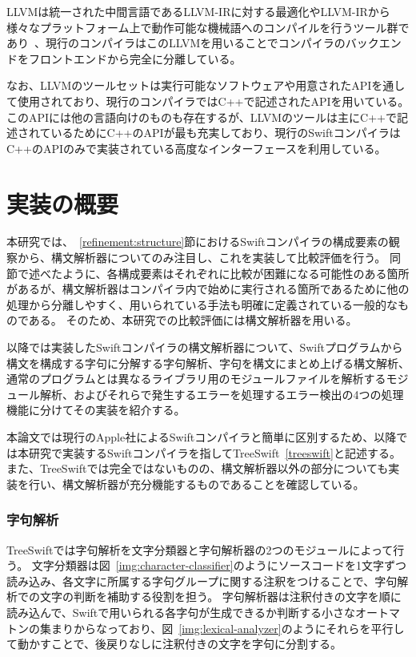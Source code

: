 LLVMは統一された中間言語であるLLVM-IRに対する最適化やLLVM-IRから様々なプラットフォーム上で動作可能な機械語へのコンパイルを行うツール群であり~\cite{llvm}、現行のコンパイラはこのLLVMを用いることでコンパイラのバックエンドをフロントエンドから完全に分離している。

なお、LLVMのツールセットは実行可能なソフトウェアや用意されたAPIを通して使用されており、現行のコンパイラではC++で記述されたAPIを用いている。
このAPIには他の言語向けのものも存在するが、LLVMのツールは主にC++で記述されているためにC++のAPIが最も充実しており、現行のSwiftコンパイラはC++のAPIのみで実装されている高度なインターフェースを利用している。

\section{実装の概要}
\label{implementation:abstract}

本研究では、~\ref{refinement:structure}節におけるSwiftコンパイラの構成要素の観察から、構文解析器についてのみ注目し、これを実装して比較評価を行う。
同節で述べたように、各構成要素はそれぞれに比較が困難になる可能性のある箇所があるが、構文解析器はコンパイラ内で始めに実行される箇所であるために他の処理から分離しやすく、用いられている手法も明確に定義されている一般的なものである。
そのため、本研究での比較評価には構文解析器を用いる。

以降では実装したSwiftコンパイラの構文解析器について、Swiftプログラムから構文を構成する字句に分解する字句解析、字句を構文にまとめ上げる構文解析、通常のプログラムとは異なるライブラリ用のモジュールファイルを解析するモジュール解析、およびそれらで発生するエラーを処理するエラー検出の4つの処理機能に分けてその実装を紹介する。

本論文では現行のApple社によるSwiftコンパイラと簡単に区別するため、以降では本研究で実装するSwiftコンパイラを指してTreeSwift~\ref{treeswift}と記述する。
また、TreeSwiftでは完全ではないものの、構文解析器以外の部分についても実装を行い、構文解析器が充分機能するものであることを確認している。

\subsubsection{字句解析}

TreeSwiftでは字句解析を文字分類器と字句解析器の2つのモジュールによって行う。
文字分類器は図~\ref{img:character-classifier}のようにソースコードを1文字ずつ読み込み、各文字に所属する字句グループに関する注釈をつけることで、字句解析での文字の判断を補助する役割を担う。
字句解析器は注釈付きの文字を順に読み込んで、Swiftで用いられる各字句が生成できるか判断する小さなオートマトンの集まりからなっており、図~\ref{img:lexical-analyzer}のようにそれらを平行して動かすことで、後戻りなしに注釈付きの文字を字句に分割する。

